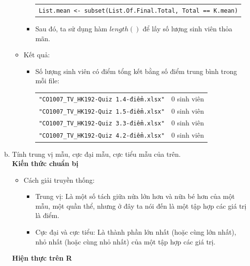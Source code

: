 \documentclass[a4paper]{article}
\theoremstyle{definition}
\begin{document}
\begin{enumerate}[a)]
\begin{itemize}
\begin{itemize}
\begin{center}
                \begin{tabular}{p{13cm}}
                    \texttt{List.mean <- subset(List.Of.Final.Total, Total == K.mean)}
                \end{tabular}
            \end{center}
            \item Sau đó, ta sử dụng hàm $length()$ để lấy số lượng sinh viên thỏa mãn.
        \end{itemize}
        \item Kết quả:
        \begin{itemize}
            \item Số lượng sinh viên có điểm tổng kết bằng số điểm trung bình trong mỗi file:
            \begin{center}
                \begin{tabular}{l c}
                     \texttt{"CO1007\_TV\_HK192-Quiz 1.4-điểm.xlsx"} & 0 sinh viên\\
                     \texttt{"CO1007\_TV\_HK192-Quiz 1.5-điểm.xlsx"} & 0 sinh viên\\
                     \texttt{"CO1007\_TV\_HK192-Quiz 3.3-điểm.xlsx"} & 0 sinh viên\\
                     \texttt{"CO1007\_TV\_HK192-Quiz 4.2-điểm.xlsx"} & 0 sinh viên
                \end{tabular}
            \end{center}
        \end{itemize}
    \end{itemize}
    \bf\item Tính trung vị mẫu, cực đại mẫu, cực tiểu mẫu của trên.\\[6pt]
    \bf Kiến thức chuẩn bị\normalfont
    \begin{itemize}
        \item Cách giải truyền thống:
        \begin{itemize}
            \item Trung vị: Là một số tách giữa nửa lớn hơn và nữa bé hơn của một mẫu, một quần thể, nhưng ở đây ta nói đến là một tập hợp các giá trị là điểm.
            \item Cực đại và cực tiểu: Là thành phần lớn nhất (hoặc cùng lớn nhất), nhỏ nhất (hoặc cùng nhỏ nhất) của một tập hợp các giá trị.
        \end{itemize}
    \end{itemize}
    \bf Hiện thực trên R\normalfont
    \begin{itemize}

\end{itemize}
\end{enumerate}
\end{document}
